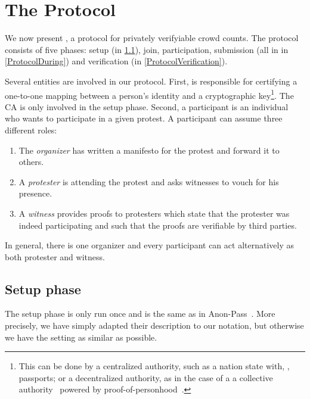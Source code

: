 \section{The \CROCUS Protocol}
\label{Protocol}


We now present \CROCUS, a protocol for privately verifyiable crowd counts.
The protocol consists of five phases: setup (in \cref{ProtocolSetup}),
join, participation, submission (all in in \cref{ProtocolDuring}) and
verification (in \cref{ProtocolVerification}).

Several entities are involved in our protocol.
First,  is responsible for certifying a one-to-one mapping between a 
person's identity and a cryptographic key\footnote{%
  This can be done by a centralized authority, such as a nation state with, 
  \eg, passports; or a decentralized authority, as in the case of a a 
  collective authority~\cite{collective-signing} powered by 
  proof-of-personhood~\cite{proof-of-personhood}.
}.
The \ac{CA} is only involved in the setup phase.
Second, a participant is an individual who wants to participate in a given 
protest.
A participant can assume three different roles:
\begin{enumerate}
\item The \emph{organizer} has written a manifesto for the protest and forward it to others.
\item A \emph{protester} is attending the protest and asks witnesses to vouch 
  for his presence.
\item A \emph{witness} provides proofs to protesters which state that the 
  protester was indeed participating and such that the proofs are verifiable by 
  third parties.
\end{enumerate}
In general, there is one organizer and every participant can act alternatively 
as both protester and witness.

\subsection{Setup phase}%
\label{ProtocolSetup}

The setup phase is only run once and is the same as in Anon-Pass~\cite{AnonPass}.
More precisely, we have simply adapted their description to our notation, but otherwise we have the setting as similar as possible.


